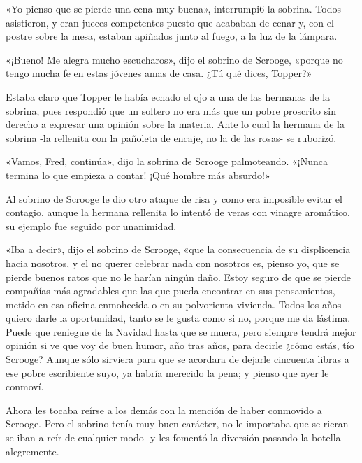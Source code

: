 \documentclass{novela}
\begin{document}
 «Yo pienso que se pierde una cena muy buena», interrumpi6 la sobrina. Todos asistieron, y eran jueces competentes puesto que acababan de cenar y, con el postre sobre la mesa, estaban apiñados junto al fuego, a la luz de la lámpara.

 «¡Bueno! Me alegra mucho escucharos», dijo el sobrino de Scrooge, «porque no tengo mucha fe en estas jóvenes amas de casa. ¿Tú qué dices, Topper?»

 Estaba claro que Topper le había echado el ojo a una de las hermanas de la sobrina, pues respondió que un soltero no era más que un pobre proscrito sin derecho a expresar una opinión sobre la materia. Ante lo cual la hermana de la sobrina -la rellenita con la pañoleta de encaje, no la de las rosas- se ruborizó.

 «Vamos, Fred, continúa», dijo la sobrina de Scrooge palmoteando. «¡Nunca termina lo que empieza a contar! ¡Qué hombre más absurdo!»

 Al sobrino de Scrooge le dio otro ataque de risa y como era imposible evitar el contagio, aunque la hermana rellenita lo intentó de veras con vinagre aromático, su ejemplo fue seguido por unanimidad.

 «Iba a decir», dijo el sobrino de Scrooge, «que la consecuencia de su displicencia hacia nosotros, y el no querer celebrar nada con nosotros es, pienso yo, que se pierde buenos ratos que no le harían ningún daño. Estoy seguro de que se pierde compañías más agradables que las que pueda encontrar en sus pensamientos, metido en esa oficina enmohecida o en su polvorienta vivienda. Todos los años quiero darle la oportunidad, tanto se le gusta como si no, porque me da lástima. Puede que reniegue de la Navidad hasta que se muera, pero siempre tendrá mejor opinión si ve que voy de buen humor, año tras años, para decirle ¿cómo estás, tío Scrooge? Aunque sólo sirviera para que se acordara de dejarle cincuenta libras a ese pobre escribiente suyo, ya habría merecido la pena; y pienso que ayer le conmoví.

 Ahora les tocaba reírse a los demás con la mención de haber conmovido a Scrooge. Pero el sobrino tenía muy buen carácter, no le importaba que se rieran -se iban a reír de cualquier modo- y les fomentó la diversión pasando la botella alegremente.
\end{document}
